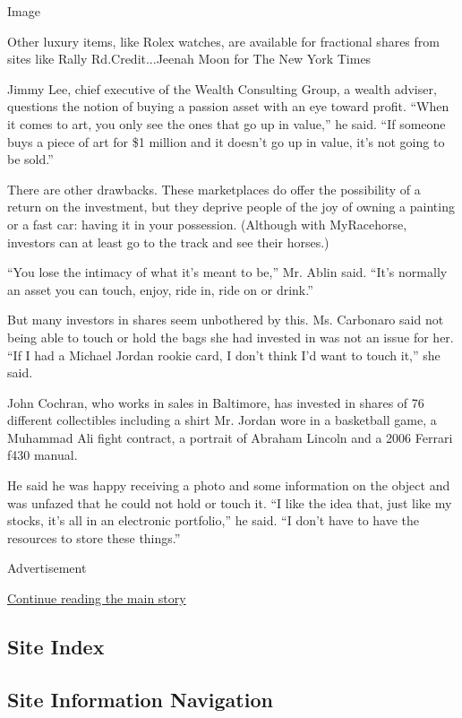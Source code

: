 Image

Other luxury items, like Rolex watches, are available for fractional
shares from sites like Rally Rd.Credit...Jeenah Moon for The New York
Times

Jimmy Lee, chief executive of the Wealth Consulting Group, a wealth
adviser, questions the notion of buying a passion asset with an eye
toward profit. ``When it comes to art, you only see the ones that go up
in value,'' he said. ``If someone buys a piece of art for \$1 million
and it doesn't go up in value, it's not going to be sold.''

There are other drawbacks. These marketplaces do offer the possibility
of a return on the investment, but they deprive people of the joy of
owning a painting or a fast car: having it in your possession. (Although
with MyRacehorse, investors can at least go to the track and see their
horses.)

``You lose the intimacy of what it's meant to be,'' Mr. Ablin said.
``It's normally an asset you can touch, enjoy, ride in, ride on or
drink.''

But many investors in shares seem unbothered by this. Ms. Carbonaro said
not being able to touch or hold the bags she had invested in was not an
issue for her. ``If I had a Michael Jordan rookie card, I don't think
I'd want to touch it,'' she said.

John Cochran, who works in sales in Baltimore, has invested in shares of
76 different collectibles including a shirt Mr. Jordan wore in a
basketball game, a Muhammad Ali fight contract, a portrait of Abraham
Lincoln and a 2006 Ferrari f430 manual.

He said he was happy receiving a photo and some information on the
object and was unfazed that he could not hold or touch it. ``I like the
idea that, just like my stocks, it's all in an electronic portfolio,''
he said. ``I don't have to have the resources to store these things.''

Advertisement

\protect\hyperlink{after-bottom}{Continue reading the main story}

\hypertarget{site-index}{%
\subsection{Site Index}\label{site-index}}

\hypertarget{site-information-navigation}{%
\subsection{Site Information
Navigation}\label{site-information-navigation}}

